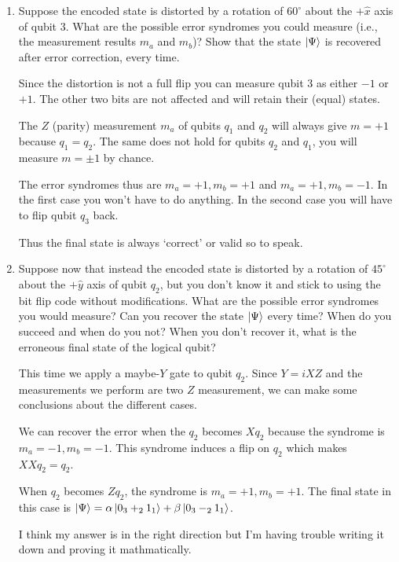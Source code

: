 \documentclass[12pt]{article}
\newenvironment{answer}{\begingroup\setlength{\leftskip}{-\leftmargin}\begin{framed}}{\end{framed}\endgroup}
\newcommand{\degcel}[1]{\ensuremath{#1^{\circ}}}
\begin{document}
\begin{enumerate}
	\item Suppose the encoded state is distorted by a rotation of $\degcel{60}$ about the $+\hat{x}$ axis of qubit 3. What are the possible error syndromes you could measure (i.e., the measurement results $m_a$ and $m_b$)? Show that the state $\ket{\Psi}$ is recovered after error correction, every time.

	\begin{answer}
		Since the distortion is not a full flip you can measure qubit 3 as either $-1$ or $+1$. The other two bits are not affected and will retain their (equal) states.

		The $Z$ (parity) measurement $m_a$ of qubits $q_1$ and $q_2$ will always give $m = +1$ because $q_1 = q_2$. The same does not hold for qubits $q_2$ and $q_1$, you will measure $m = \pm1$ by chance.

		The error syndromes thus are $m_a = +1, m_b = +1$ and $m_a = +1, m_b = -1$. In the first case you won't have to do anything. In the second case you will have to flip qubit $q_3$ back.

        Thus the final state is always `correct' or valid so to speak.
	\end{answer}

	\item Suppose now that instead the encoded state is distorted by a rotation of $\degcel{45}$ about the $+\hat{y}$ axis of qubit $q_2$, but you don't know it and stick to using the bit flip code without modifications. What are the possible error syndromes you would measure? Can you recover the state $\ket{\Psi}$ every time? When do you succeed and when do you not? When you don't recover it, what is the erroneous final state of the logical qubit?

	\begin{answer}
		This time we apply a maybe-$Y$ gate to qubit $q_2$. Since $Y = iXZ$ and the measurements we perform are two $Z$ measurement, we can make some conclusions about the different cases.

		We can recover the error when the $q_2$ becomes $Xq_2$ because the syndrome is $m_a = -1, m_b = -1$. This syndrome induces a flip on $q_2$ which makes $XXq_2 = q_2$.

        When $q_2$ becomes $Zq_2$, the syndrome is $m_a = +1, m_b = +1$. The final state in this case is $\ket{\Psi} = \alpha\ket{0_3+_21_1} + \beta\ket{0_3-_21_1}$.

        I think my answer is in the right direction but I'm having trouble writing it down and proving it mathmatically.
	\end{answer}
\end{enumerate}
\end{document}
